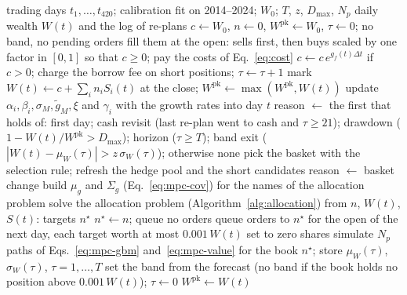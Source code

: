 \begin{algorithm}[t]
\caption{Daily loop of one backtest run. A run fixes a selection rule, a weighting rule, the hedge setting and a
seed. Every decision uses data dated on or before the close of its day.}
\label{alg:mpc}
\begin{algorithmic}[1]
\REQUIRE trading days $t_1, \dots, t_{420}$; calibration fit on 2014--2024; $W_0$; $T$, $z$, $D_{\max}$, $N_p$
\ENSURE daily wealth $W(t)$ and the log of re-plans
\STATE $c \gets W_0$, $n \gets 0$, $W^{\mathrm{pk}} \gets W_0$, $\tau \gets 0$; no band, no pending orders
    \STATE fill them at the open: sells first, then buys scaled by one factor in $[0,1]$ so that $c \ge 0$; pay
      the costs of Eq.~\eqref{eq:cost}
  \ENDIF
    \STATE $c \gets c\,e^{g_f(t)\Delta t}$ if $c > 0$; charge the borrow fee on short positions; $\tau \gets \tau + 1$
  \ENDIF
  \STATE mark $W(t) \gets c + \sum_i n_i S_i(t)$ at the close; $W^{\mathrm{pk}} \gets \max(W^{\mathrm{pk}}, W(t))$
  \STATE update $\alpha_i, \beta_i, \sigma_M, \tilde g_M, \xi$ and $\gamma_i$ with the growth rates into day $t$
  \STATE reason $\gets$ the first that holds of: first day; cash revisit (last re-plan went to cash and
    $\tau \ge 21$); drawdown ($1 - W(t)/W^{\mathrm{pk}} > D_{\max}$); horizon ($\tau \ge T$); band exit
    ($|W(t) - \mu_W(\tau)| > z\,\sigma_W(\tau)$); otherwise none
    \STATE pick the basket with the selection rule; refresh the hedge pool and the short candidates
      \STATE reason $\gets$ basket change
    \ENDIF
  \ENDIF
    \STATE build $\mu_g$ and $\Sigma_g$ (Eq.~\eqref{eq:mpc-cov}) for the names of the allocation problem
    \STATE solve the allocation problem (Algorithm~\ref{alg:allocation}) from $n$, $W(t)$, $S(t)$: targets $n^\star$
      \STATE $n^\star \gets n$; queue no orders
      \STATE queue orders to $n^\star$ for the open of the next day, each target worth at most $0.001\,W(t)$ set
        to zero shares
    \ENDIF
    \STATE simulate $N_p$ paths of Eqs.~\eqref{eq:mpc-gbm} and~\eqref{eq:mpc-value} for the book $n^\star$; store
      $\mu_W(\tau)$, $\sigma_W(\tau)$, $\tau = 1, \dots, T$
    \STATE set the band from the forecast (no band if the book holds no position above $0.001\,W(t)$);
      $\tau \gets 0$
      \STATE $W^{\mathrm{pk}} \gets W(t)$
    \ENDIF
  \ENDIF
\ENDFOR
\end{algorithmic}
\end{algorithm}

